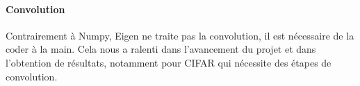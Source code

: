 \paragraph{Convolution}\label{implementation-C++-convolution}
Contrairement à Numpy, Eigen ne traite pas la convolution, il est nécessaire de la coder à la main. Cela nous a ralenti dans l'avancement du projet et dans l'obtention de résultats, notamment pour CIFAR qui nécessite des étapes de convolution.